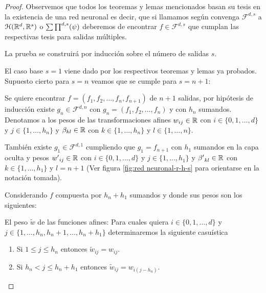 \begin{proof}
    Observemos que todos los teoremas y lemas mencionados basan su tesis
    en la existencia de una red neuronal es decir, que si llamamos según 
    convenga $\mathcal{F}^{d,s}$ a $\mathcal{H}(\mathbb{R}^d,\mathbb{R}^s)$ o $\sum \prod^{d,s} (\psi)$ deberemos de 
    encontrar $f \in \mathcal{F}^{d,s}$ que cumplan las respectivas tesis para salidas múltiples. 

    La prueba se construirá por inducción sobre el número de salidas $s$. 

\reversemarginpar
\setlength{\marginparwidth}{\smallMarginSize}

\normalmarginpar
\setlength{\marginparwidth}{\bigMarginSize}

    El caso base $s=1$ viene dado por los respectivos teoremas y lemas ya probados.
    Supuesto cierto para $s = n$ veamos que se cumple para $s=n+1$: 
    
    Se quiere encontrar 
    $f = (f_1, f_2, \ldots, f_n, f_{n+1})$ de $n+1$ salidas, 
    por hipótesis de inducción existe $g_n \in \mathcal{F}^{d,n}$ con
     $g_n = (f_1, f_2, \ldots, f_n)$ y con $h_n$ sumandos. Denotamos a los pesos de las transformaciones afines 
     $w_{i j} \in \mathbb{R}$ con 
     $i \in \{0, 1, \ldots , d \}$  y  $j \in \{1, \ldots ,h_n \}$ 
     y $\beta_{ k l} \in \mathbb{R}$ con 
     $k \in \{1, \ldots ,h_n \}$  y  $l \in \{1, \ldots ,n \}.$

    También existe $g_1 \in \mathcal{F}^{d,1}$ cumpliendo que
    $g_1 = f_{n+1}$ con $h_1$ sumandos en la capa oculta
    y pesos  
    ${w'}_{i j} \in \mathbb{R}$ con 
     $i \in \{0, 1, \ldots , d \}$  y  $j \in \{1, \ldots , h_1 \}$ 
     y ${\beta '}_{ k l} \in \mathbb{R}$ con 
     $k \in \{1, \ldots , h_1 \}$  y  $l = {n+1}$
     (Ver figura \ref{fig:red neuronal-r-h-s} para orientarse en la notación tomada).
     
    Considerando $f$ compuesta por $h_n + h_1$ sumandos y donde sus pesos son los siguientes:

    El peso $\tilde{w}$ de las funciones afines: 
    Para cuales quiera 
    $i \in \{0, 1, \ldots  , d \}$  y  
    $j \in \{1, \ldots , h_n, h_{n} + 1, \ldots, h_n + h_1\}$  determinaremos la siguiente casuística
    \begin{enumerate}
        \item Si $1 \leq j \leq h_n$ entonces $\tilde{w}_{i j} = w_{i j}.$
        \item Si $h_n < j \leq h_n + h_1$ entonces $\tilde{w}_{i j} = w_{i (j-h_n)}.$
    \end{enumerate}


\end{proof}
